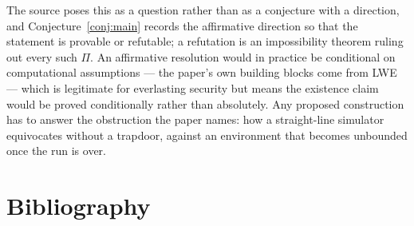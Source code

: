 \documentclass{aicr-conjecture}
\begin{document}
\begin{remark}\label{rem:framing}
The source poses this as a question rather than as a conjecture with a
direction, and Conjecture~\ref{conj:main} records the affirmative
direction so that the statement is provable or refutable; a refutation
is an impossibility theorem ruling out every such $\Pi$. An affirmative
resolution would in practice be conditional on computational
assumptions --- the paper's own building blocks come from LWE --- which
is legitimate for everlasting security but means the existence claim
would be proved conditionally rather than absolutely. Any proposed
construction has to answer the obstruction the paper names: how a
straight-line simulator equivocates without a trapdoor, against an
environment that becomes unbounded once the run is over.
\end{remark}

\section{Bibliography}
\end{document}
